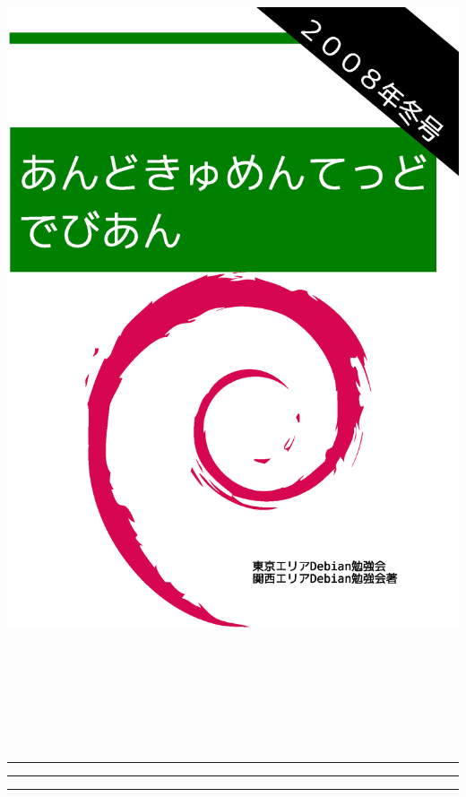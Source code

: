 \documentclass[mingoth,a4paper]{jsarticle}
\begin{document}
\begin{titlepage}
\includegraphics[height=252mm]{image2008-fuyu/2008-winter.eps}
\end{titlepage}

\newpage
\begin{minipage}[]{0.2\hsize}
 \colorbox{dancerlightblue}{}
\end{minipage}
\begin{minipage}[]{0.8\hsize}
\hrule
\vspace{1mm}
\hrule
\setcounter{tocdepth}{1}
{\small
 \tableofcontents}
\vspace{1mm}
\hrule
\vspace{3cm}

\end{minipage}
\end{document}
